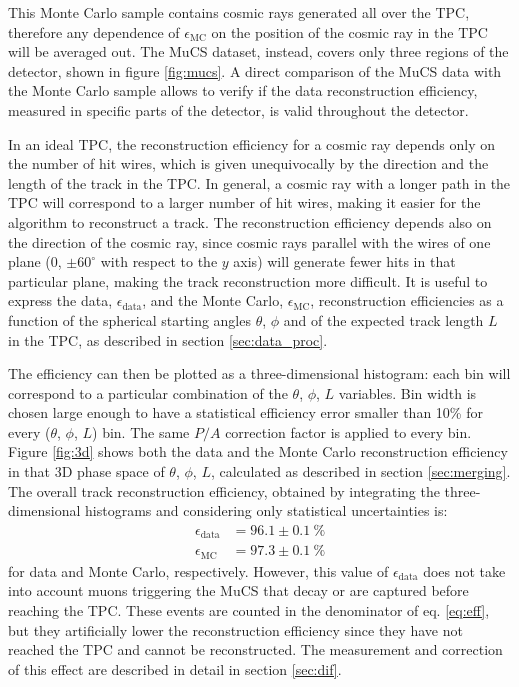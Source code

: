 \documentclass[a4paper,11pt]{article}
\begin{document}
This Monte Carlo sample contains cosmic rays generated all over the TPC, therefore  any dependence of $\epsilon_{\mathrm{MC}}$ on the position of the cosmic ray in the TPC will be averaged out. The MuCS dataset, instead, covers only three regions of the detector, shown in figure \ref{fig:mucs}. A direct comparison of the MuCS data with the Monte Carlo sample allows to verify if the data reconstruction efficiency, measured in specific parts of the detector, is valid throughout the detector.

In an ideal TPC, the reconstruction efficiency for a cosmic ray depends only on the number of hit wires, which is given unequivocally by the direction and the length of the track in the TPC. In general, a cosmic ray with a longer path in the TPC will correspond to a larger number of hit wires, making it easier for the algorithm to reconstruct a track. The reconstruction efficiency depends also on the direction of the cosmic ray, since cosmic rays parallel with the wires of one plane (0, $\pm60^{\circ}$ with respect to the $y$ axis) will generate fewer hits in that particular plane, making the track reconstruction more difficult.
It is useful to express the data, $\epsilon_{\mathrm{data}}$, and the Monte Carlo, $\epsilon_{\mathrm{MC}}$, reconstruction efficiencies as a function of the spherical starting angles $\theta$, $\phi$ and of the expected track length $L$ in the TPC, as described in section \ref{sec:data_proc}.

The efficiency can then be plotted as a three-dimensional histogram: each bin will correspond to a particular combination of the $\theta$, $\phi$, $L$ variables. Bin width is chosen large enough to have a statistical efficiency error smaller than 10\% for every ($\theta$, $\phi$, $L$) bin. The same $P/A$ correction factor is applied to every bin. Figure \ref{fig:3d} shows both the data and the Monte Carlo reconstruction efficiency in that 3D phase space of $\theta$, $\phi$, $L$, calculated as described in section \ref{sec:merging}. The overall track reconstruction efficiency, obtained by integrating the three-dimensional histograms and considering only statistical uncertainties is:
\begin{align*}
\epsilon_{\mathrm{data}} &= 96.1 \pm 0.1~\%\\
\epsilon_{\mathrm{MC}} &= 97.3 \pm 0.1~\%
\end{align*} for data and Monte Carlo, respectively. However, this value of $\epsilon_{\mathrm{data}}$ does not take into account muons triggering the MuCS that decay or are captured before reaching the TPC. These events are counted in the denominator of eq. \eqref{eq:eff}, but they artificially lower the reconstruction efficiency since they have not reached the TPC and cannot be reconstructed. The measurement and correction of this effect are described in detail in section \ref{sec:dif}.
\end{document}
